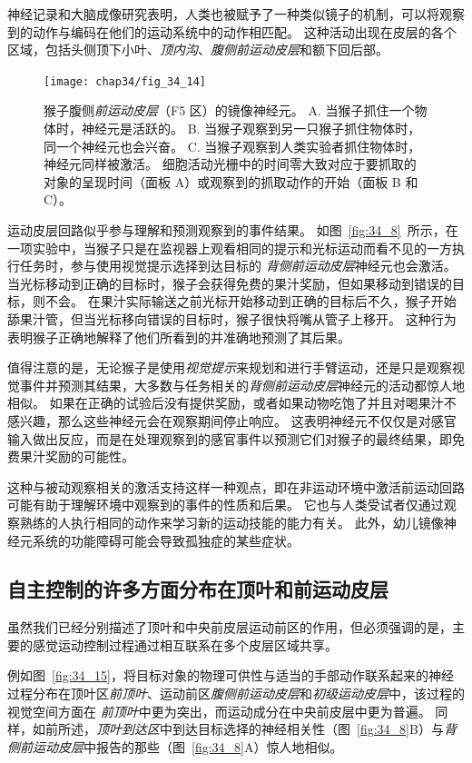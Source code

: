 神经记录和大脑成像研究表明，人类也被赋予了一种类似镜子的机制，可以将观察到的动作与编码在他们的运动系统中的动作相匹配。
这种活动出现在皮层的各个区域，包括头侧顶下小叶、\textit{顶内沟}、\textit{腹侧前运动皮层}和额下回后部。


\begin{figure}[htbp]
	\centering
	\texttt{[image: chap34/fig\_34\_14]}
	\caption{猴子腹侧\textit{前运动皮层}（F5 区）的镜像神经元\cite{rizzolatti1996premotor}。
		A. 当猴子抓住一个物体时，神经元是活跃的。
		B. 当猴子观察到另一只猴子抓住物体时，同一个神经元也会兴奋。
		C. 当猴子观察到人类实验者抓住物体时，神经元同样被激活。
		细胞活动光栅中的时间零大致对应于要抓取的对象的呈现时间（面板 A）或观察到的抓取动作的开始（面板 B 和 C）。}
	\label{fig:34_14}
\end{figure}


运动皮层回路似乎参与理解和预测观察到的事件结果。
如图~\ref{fig:34_8}~所示，在一项实验中，当猴子只是在监视器上观看相同的提示和光标运动而看不见的一方执行任务时，参与使用视觉提示选择到达目标的 \textit{背侧前运动皮层}神经元也会激活。
当光标移动到正确的目标时，猴子会获得免费的果汁奖励，但如果移动到错误的目标，则不会。
在果汁实际输送之前光标开始移动到正确的目标后不久，猴子开始舔果汁管，但当光标移向错误的目标时，猴子很快将嘴从管子上移开。
这种行为表明猴子正确地解释了他们所看到的并准确地预测了其后果。


值得注意的是，无论猴子是使用\textit{视觉提示}来规划和进行手臂运动，还是只是观察视觉事件并预测其结果，大多数与任务相关的\textit{背侧前运动皮层}神经元的活动都惊人地相似。
如果在正确的试验后没有提供奖励，或者如果动物吃饱了并且对喝果汁不感兴趣，那么这些神经元会在观察期间停止响应。
这表明神经元不仅仅是对感官输入做出反应，而是在处理观察到的感官事件以预测它们对猴子的最终结果，即免费果汁奖励的可能性。


这种与被动观察相关的激活支持这样一种观点，即在非运动环境中激活前运动回路可能有助于理解环境中观察到的事件的性质和后果。
它也与人类受试者仅通过观察熟练的人执行相同的动作来学习新的运动技能的能力有关。
此外，幼儿镜像神经元系统的功能障碍可能会导致孤独症的某些症状。



\subsection{自主控制的许多方面分布在顶叶和前运动皮层}

虽然我们已经分别描述了顶叶和中央前皮层运动前区的作用，但必须强调的是，主要的感觉运动控制过程通过相互联系在多个皮层区域共享。


例如图~\ref{fig:34_15}，将目标对象的物理可供性与适当的手部动作联系起来的神经过程分布在顶叶区\textit{前顶叶}、运动前区\textit{腹侧前运动皮层}和\textit{初级运动皮层}中，该过程的视觉空间方面在 \textit{前顶叶}中更为突出，而运动成分在中央前皮层中更为普遍。 
同样，如前所述，\textit{顶叶到达区}中到达目标选择的神经相关性（图~\ref{fig:34_8}B）与\textit{背侧前运动皮层}中报告的那些（图~\ref{fig:34_8}A）惊人地相似。


